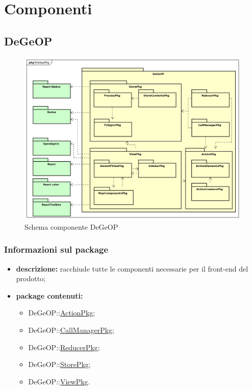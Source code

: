 \section{Componenti}
\subsection{DeGeOP}
\label{pkg::DeGeOP}
\begin{figure}[H]
	\centering
	\includegraphics[width=\textwidth]{img/PkgDiagram/DeGeOPPkg.png}
	\caption{Schema componente DeGeOP}
\end{figure}
\subsubsection{Informazioni sul package}
\begin{itemize}
	\item \textbf{descrizione:} racchiude tutte le componenti necessarie per il front-end del prodotto;
	\item \textbf{package contenuti:}
	\begin{itemize}
		\item DeGeOP::\hyperref[pkg::ActionPkg]{ActionPkg};
		\item DeGeOP::\hyperref[pkg::CallManagerPkg]{CallManagerPkg};
		\item DeGeOP::\hyperref[pkg::ReducerPkg]{ReducerPkg};
		\item DeGeOP::\hyperref[pkg::StorePkg]{StorePkg};
		\item DeGeOP::\hyperref[pkg::ViewPkg]{ViewPkg}.
	\end{itemize}
\end{itemize}
\newpage
